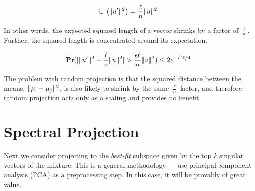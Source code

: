 \documentclass{book}
\numberwithin{exercise}{chapter}
\begin{document}
$$\hbox{{\sf E}\;}\left(\|u'\|^2\right) = \frac{\ell}{n}\|u\|^2$$

In other words, the expected squared length of a vector shrinks by a factor of $\frac{\ell}{n}$. Further, the squared length is concentrated around its expectation.

$$\mbox{{\bf Pr}}(|\|u'\|^2 - \frac{\ell}{n}\|u\|^2| > \frac{\epsilon
\ell}{n}\|u\|^2) \le 2e^{-\epsilon^2\ell/4}$$


The problem with random projection is that the squared distance between the
means, $\|\mu_i-\mu_j\|^2$, is also likely to shrink by the same
$\frac{\ell}{n}$ factor, and therefore random
projection acts only as a scaling and provides no benefit.

\section{Spectral Projection}

Next we consider projecting to the
{\em best-fit} subspace given by the top $k$ singular vectors of the mixture.
This is a general methodology --- use principal component analysis (PCA) as a preprocessing step. In this case, it will be
provably of great value.

\begin{center}
\end{center}
\end{document}

